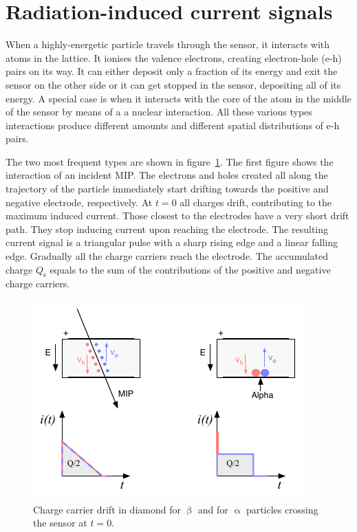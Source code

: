 \section{Radiation-induced current signals}


When a highly-energetic particle travels through the sensor, it interacts with atoms in the lattice. It ionises the valence electrons, creating electron-hole (e-h) pairs on its way. It can either deposit only a fraction of its energy and exit the sensor on the other side or it can get stopped in the sensor, depositing all of its energy. A special case is when it interacts with the core of the atom in the middle of the sensor by means of a a nuclear interaction. All these various types interactions produce different amounts and different spatial distributions of e-h pairs. 

The two most frequent types are shown in figure~\ref{fig:drift}. The first figure shows the interaction of an incident MIP. The electrons and holes created all along the trajectory of the particle immediately start drifting towards the positive and negative electrode, respectively. At $t=0$ all charges drift, contributing to the maximum induced current. Those closest to the electrodes have a very short drift path. They stop inducing current upon reaching the electrode. The resulting current signal is a triangular pulse with a sharp rising edge and a linear falling edge. Gradually all the charge carriers reach the electrode. The accumulated charge $Q_\mathrm{s}$ equals to the sum of the contributions of the positive and negative charge carriers. 

\begin{figure}[!t]
\begin{center}
\includegraphics[width=0.7\linewidth]{02_pulse_formation/pics/plots/driftboth}
\caption{Charge carrier drift in diamond for $\upbeta$ and for $\upalpha$ particles crossing the sensor at $t=0$.}
\label{fig:drift}
\end{center}
\end{figure}

